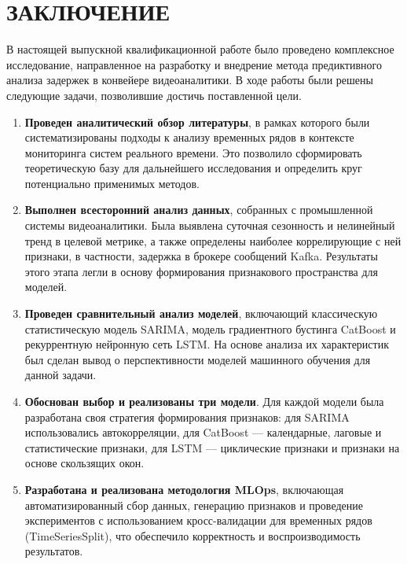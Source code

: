 \chapter*{ЗАКЛЮЧЕНИЕ}

В настоящей выпускной квалификационной работе было проведено комплексное исследование, направленное на разработку и внедрение метода предиктивного анализа задержек в конвейере видеоаналитики. В ходе работы были решены следующие задачи, позволившие достичь поставленной цели.

\begin{enumerate}
    \item \textbf{Проведен аналитический обзор литературы}, в рамках которого были систематизированы подходы к анализу временных рядов в контексте мониторинга систем реального времени. Это позволило сформировать теоретическую базу для дальнейшего исследования и определить круг потенциально применимых методов.

    \item \textbf{Выполнен всесторонний анализ данных}, собранных с промышленной системы видеоаналитики. Была выявлена суточная сезонность и нелинейный тренд в целевой метрике, а также определены наиболее коррелирующие с ней признаки, в частности, задержка в брокере сообщений Kafka. Результаты этого этапа легли в основу формирования признакового пространства для моделей.

    \item \textbf{Проведен сравнительный анализ моделей}, включающий классическую статистическую модель SARIMA, модель градиентного бустинга CatBoost и рекуррентную нейронную сеть LSTM. На основе анализа их характеристик был сделан вывод о перспективности моделей машинного обучения для данной задачи.

    \item \textbf{Обоснован выбор и реализованы три модели}. Для каждой модели была разработана своя стратегия формирования признаков: для SARIMA использовались автокорреляции, для CatBoost — календарные, лаговые и статистические признаки, для LSTM — циклические признаки и признаки на основе скользящих окон.

    \item \textbf{Разработана и реализована методология MLOps}, включающая автоматизированный сбор данных, генерацию признаков и проведение экспериментов с использованием кросс-валидации для временных рядов (TimeSeriesSplit), что обеспечило корректность и воспроизводимость результатов.


\end{enumerate}
